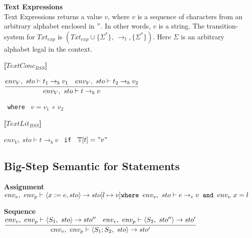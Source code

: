 \textbf{\large{Text Expressions}}\\
Text Expressions returns a value $v$, where $v$ is a sequence of characters from an arbitrary alphabet enclosed in $"$.
In other words, $v$ is a string.
The transition-system for $Txt_{exp}$ is $(Txt_{exp} \cup \{\Sigma^*\},\ \rightarrow_t, \{\Sigma^*\})$.
Here $\Sigma$ is an arbitrary alphabet legal in the context.

\textbf{[$TextConc_{BSS}$]}\\
\begin{center}
	\begin{math}
	\cfrac
		{env_V,\ sto \vdash t_1 \rightarrow_b v_1 \quad env_V,\ sto \vdash t_2 \rightarrow_b v_2}
		{env_V,\ sto \vdash t \rightarrow_b v}
	\end{math}
	
	\texttt{ where } $v = v_1\ \circ\ v_2$
\end{center}

\textbf{[$TextLit_{BSS}$]}\\
\begin{center}
	\begin{math}
	env_V,\ sto \vdash t \rightarrow_b v
	\end{math}
	\texttt{ if } $\mathbb{T}[t] = "v"$
\end{center}














\subsection{Big-Step Semantic for Statements}
\textbf{Assignment}\\
\begin{math}
	env_v,\ env_p \vdash \langle x := e, sto \rangle \rightarrow sto[l \mapsto v]\\
	\texttt{where } env_v,\ sto \vdash e \rightarrow_e v
	\texttt{ and } env_v\ x = l
\end{math}

\textbf{Sequence}\\
\begin{math}
	\cfrac
		{env_v,\ env_p \vdash \langle S_1,\ sto \rangle \rightarrow sto'' \quad env_v,\ env_p \vdash \langle S_2,\ sto'' \rangle \rightarrow sto'}
		{env_v,\ env_p \vdash \langle S_1;S_2,\ sto \rangle \rightarrow sto'}
\end{math}

